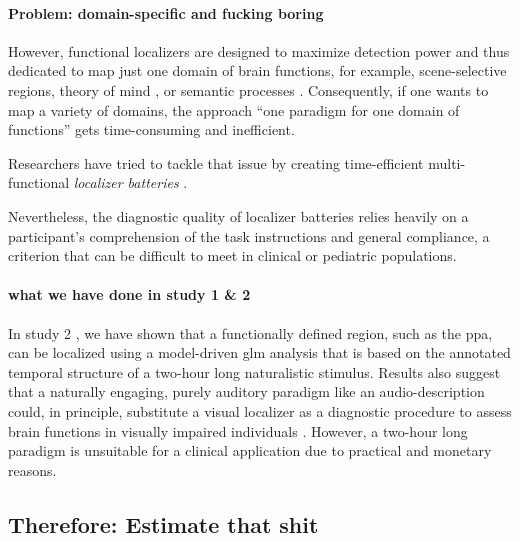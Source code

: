 
\paragraph{Problem: domain-specific and fucking boring}


However, functional localizers are designed to maximize detection power and thus
dedicated to map just one domain of brain functions, for example,
scene-selective regions, theory of mind \citep{spunt2014validating}, or
semantic processes \citep{fernandez2001language}.
Consequently, if one wants to map a variety of domains, the approach ``one
paradigm for one domain of functions'' gets time-consuming and inefficient.


Researchers have tried to tackle that issue by creating time-efficient
multi-functional \textit{localizer batteries} \citep[e.g.,][]{barch2013function,
drobyshevsky2006rapid, pinel2007fast}.

Nevertheless, the diagnostic quality of localizer batteries relies heavily on
a participant's comprehension of the task instructions and general compliance,
a criterion that can be difficult to meet in clinical or pediatric populations.


\paragraph{what we have done in study 1 \& 2}

%
In study 2 \citep{haeusler2022processing}, we have shown that a functionally
defined region, such as the \ac{ppa}, can be localized using a model-driven
\ac{glm} analysis that is based on the annotated temporal structure of a
two-hour long naturalistic stimulus.
%
Results also suggest that a naturally engaging, purely auditory paradigm like an
audio-description could, in principle, substitute a visual localizer as a
diagnostic procedure to assess brain functions in visually impaired individuals
\citep{haeusler2022processing}.
%
However, a two-hour long paradigm is unsuitable for a clinical application due
to practical and monetary reasons.


\subsection{Therefore: Estimate that shit}

